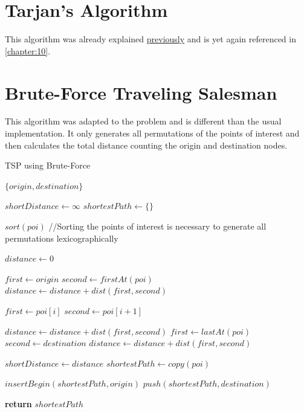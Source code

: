 \documentclass[a4paper, 12pt]{report}
\begin{document}
    \section{Tarjan's Algorithm}
    
    This algorithm was already explained \hyperref[alg:tarjan]{previously} and is yet again referenced in \autoref{chapter:10}.
    
    \section{Brute-Force Traveling Salesman}
    
    This algorithm was adapted to the problem and is different than the usual implementation. It only generates all permutations of the points of interest and then calculates the total distance counting the origin and destination nodes.
    
    \begin{algorithm}
    	\caption{TSP using Brute-Force} 
	    \begin{algorithmic}[1]
	    
                \Return $\{origin, destination\}$
            \EndIf
            
            \State $shortDistance \gets \infty$
            \State $shortestPath \gets \{\}$
            
            \State $sort(poi)$ //Sorting the points of interest is necessary to generate all permutations lexicographically
            
            \Repeat 
                \State $distance \gets 0$
                
                \State $first \gets origin$
                \State $second \gets firstAt(poi)$
                \State $distance \gets distance + dist(first, second)$
                
                    \State $first \gets poi[i]$
                    \State $second \gets poi[i+1]$
                    
                    \State $distance \gets distance + dist(first, second)$
                \EndFor
                \State $first \gets lastAt(poi)$
                \State $second \gets destination$
                \State $distance \gets distance + dist(first, second)$
                
                    \State $shortDistance \gets distance$
                    \State $shortestPath \gets copy(poi)$
                \EndIf
            
            \State $insertBegin(shortestPath, origin)$
            \State $push(shortestPath, destination)$
            
            \State \textbf{return} $shortestPath$
            
	    \EndFunction
	    \end{algorithmic} 
	\end{algorithm}
\end{document}
